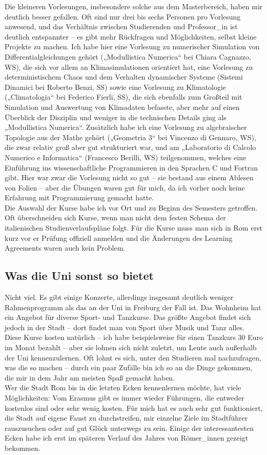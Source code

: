 \documentclass[a4paper,12pt]{article}
\begin{document}
Die kleineren Vorlesungen, insbesondere solche aus dem Masterbereich, haben mir deutlich besser gefallen. Oft sind nur drei bis sechs Personen pro Vorlesung anwesend, und das Verhältnis zwischen Studierenden und Professor\_in ist deutlich entspannter – es gibt mehr Rückfragen und Möglichkeiten, selbst kleine Projekte zu machen. Ich habe hier eine Vorlesung zu numerischer Simulation von Differentialgleichungen gehört („Modullistica Numerica“ bei Chiara Cagnazzo, WS), die sich vor allem an Klimasimulationen orientiert hat, eine Vorlesung zu deterministischem Chaos und dem Verhalten dynamischer Systeme (Sistemi Dinamici bei Roberto Benzi, SS) sowie eine Vorlesung zu Klimatologie („Climatologia“ bei Federico Fierli, SS), die sich ebenfalls zum Großteil mit Simulation und Auswertung von Klimadaten befasste, aber mehr auf einen Überblick der Disziplin und weniger in die technischen Details ging als „Modullistica Numerica“. Zusätzlich habe ich eine Vorlesung zu algebraischer Topologie aus der Mathe gehört („Geometria 3“ bei Vincenzo di Gennaro, WS), die zwar relativ groß aber gut strukturiert war, und am „Laboratorio di Calcolo Numerico e Informatica“ (Francesco Berilli, WS) teilgenommen, welches eine Einführung ins wissenschaftliche Programmieren in den Sprachen C und Fortran gibt. Hier war zwar die Vorlesung nicht so gut – sie bestand aus einem Ablesen von Folien – aber die Übungen waren gut für mich, da ich vorher noch keine Erfahrung mit Programmierung gemacht hatte. \\
Die Auswahl der Kurse habe ich vor Ort und zu Beginn des Semesters getroffen. Oft überschneiden sich Kurse, wenn man nicht dem festen Schema der italienischen Studienverlaufspläne folgt. Für die Kurse muss man sich in Rom erst kurz vor er Prüfung offiziell anmelden und die Änderungen des Learning Agreements waren auch kein Problem.

\subsection*{Was die Uni sonst so bietet}
Nicht viel. Es gibt einige Konzerte, allerdings insgesamt deutlich weniger Rahmenprogramm als das an der Uni in Freiburg der Fall ist. Das Wohnheim hat ein Angebot für diverse Sport- und Tanzkurse. Das größte Angebot findet sich jedoch in der Stadt – dort findet man von Sport über Musik und Tanz alles. Diese Kurse kosten natürlich – ich habe beispielsweise für einen Tanzkurs 30 Euro im Monat bezahlt – aber sie lohnen sich nicht zuletzt, um Leute auch außerhalb der Uni kennenzulernen. Oft lohnt es sich, unter den Studieren mal nachzufragen, was die so machen – durch ein paar Zufälle bin ich so an die Dinge gekommen, die mir in dem Jahr am meisten Spaß gemacht haben. \\
Wer die Stadt Rom bis in die letzten Ecken kennenlernen möchte, hat viele Möglichkeiten: Vom Erasmus gibt es immer wieder Führungen, die entweder kostenlos sind oder sehr wenig kosten. Für mich hat es auch sehr gut funktioniert, die Stadt auf eigene Faust zu durchstreifen, mir einzelne Ziele im Stadtführer rauszusuchen oder auf gut Glück unterwegs zu sein. Einige der interessantesten Ecken habe ich erst im späteren Verlauf des Jahres von Römer\_innen gezeigt bekommen. 
\end{document}
